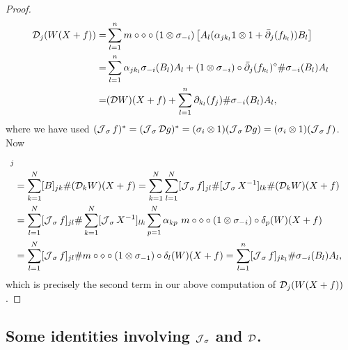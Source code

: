 \begin{proof}
	\begin{align*}
		\mathcal D_j(W(X+f))=&\sum_{l=1}^n m\circ\diamond\circ(1\otimes \sigma_{-i})\left[ A_l (\alpha_{jk_l}1\otimes 1+\bar{\partial}_j(f_{k_l}) )B_l\right]\\
				=&\sum_{l=1}^n  \alpha_{j k_l} \sigma_{-i}(B_l)A_l + (1\otimes\sigma_{-i})\circ\bar{\partial}_j(f_{k_l})^\diamond\# \sigma_{-i}(B_l)A_l\\
				=&(\mathcal D W)(X+f)+\sum_{l=1}^n \partial_{k_l}(f_j)\#\sigma_{-i}(B_l)A_l,
	\end{align*}
where we have used $(\operatorname{\mathcal J}_\sigma f)^*=(\operatorname{\mathcal J}_\sigma\mathcal D g)^*=(\sigma_i\otimes 1)(\operatorname{\mathcal J}_\sigma\mathcal D g)=(\sigma_i\otimes 1)(\operatorname{\mathcal J}_\sigma f)$. Now
	\begin{align*}
		[&B\# (\D W)(X+f)]_j\\
			&=\sum_{k=1}^N [B]_{jk}\# (\D_k W)(X+f)=\sum_{k=1}^N \sum_{l=1}^N [\J_\sigma f]_{jl}\# [\J_\sigma X^{-1}]_{lk}\# (\D_k W)(X+f)\\
				&= \sum_{l=1}^N [\J_\sigma f]_{jl}\#\sum_{k=1}^N [\J_\sigma X^{-1}]_{lk} \sum_{p=1}^N \alpha_{kp}\ m\circ\diamond\circ(1\otimes\sigma_{-i})\circ\delta_p (W)(X+f)\\
				&=\sum_{l=1}^N [\J_\sigma f]_{jl}\# m\circ\diamond\circ(1\otimes\sigma_{-1})\circ\delta_l(W)(X+f)=\sum_{l=1}^n [\J_\sigma f]_{j k_l}\# \sigma_{-i}(B_l)A_l,
	\end{align*}
which is precisely the second term in our above computation of $\mathcal D_j(W(X+f))$.
\end{proof}



\subsection{Some identities involving $\operatorname{\mathcal J}_\sigma$ and $\mathcal D$.}\label{identities}

